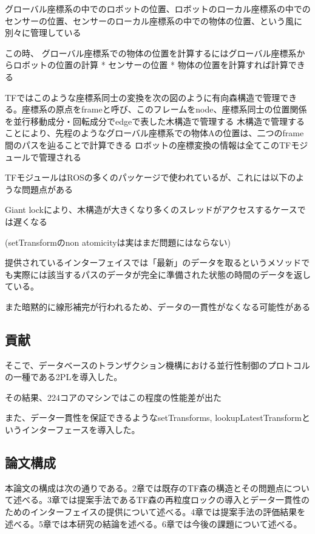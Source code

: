 \documentclass{jarticle}
\begin{document}
\begin{multicols}{2}
グローバル座標系の中でのロボットの位置、ロボットのローカル座標系の中でのセンサーの位置、センサーのローカル座標系の中での物体の位置、という風に別々に管理している

この時、
グローバル座標系での物体の位置を計算するにはグローバル座標系からロボットの位置の計算 * センサーの位置 * 物体の位置を計算すれば計算できる

TFではこのような座標系同士の変換を次の図のように有向森構造で管理できる。座標系の原点をframeと呼び、このフレームをnode、座標系同士の位置関係を並行移動成分・回転成分でedgeで表した木構造で管理する
木構造で管理することにより、先程のようなグローバル座標系での物体Aの位置は、二つのframe間のパスを辿ることで計算できる
ロボットの座標変換の情報は全てこのTFモジュールで管理される

TFモジュールはROSの多くのパッケージで使われているが、これには以下のような問題点がある

Giant lockにより、木構造が大きくなり多くのスレッドがアクセスするケースでは遅くなる

(setTransformのnon atomicityは実はまだ問題にはならない)

提供されているインターフェイスでは「最新」のデータを取るというメソッドでも実際には該当するパスのデータが完全に準備された状態の時間のデータを返している。

また暗黙的に線形補完が行われるため、データの一貫性がなくなる可能性がある





\subsection{貢献}
そこで、データベースのトランザクション機構における並行性制御のプロトコルの一種である2PLを導入した。

その結果、224コアのマシンではこの程度の性能差が出た

また、データ一貫性を保証できるようなsetTransforms, lookupLatestTransformというインターフェースを導入した。

\subsection{論文構成}
本論文の構成は次の通りである。2章では既存のTF森の構造とその問題点について述べる。3章では提案手法であるTF森の再粒度ロックの導入とデータ一貫性のためのインターフェイスの提供について述べる。4章では提案手法の評価結果を述べる。5章では本研究の結論を述べる。6章では今後の課題について述べる。




\end{multicols}
\end{document}
